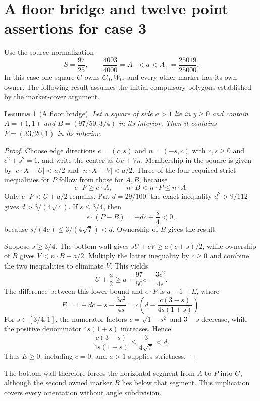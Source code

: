 \documentclass[11pt]{article}
\newtheorem{lemma}[theorem]{Lemma}
\begin{document}
\section{A floor bridge and twelve point assertions for case 3}
\label{sec:short-case-three}

Use the source normalization
\[
 S=\frac{97}{25},\qquad
 \frac{4003}{4000}=A_-<a<A_+=\frac{25019}{25000}.
\]
In this case one square $G$ owns $C_0,W_0$, and every other marker has its own
owner.  The following result assumes the initial compulsory polygons
established by the marker-cover argument.

\begin{lemma}[A floor bridge]\label{lem:case-three-floor-bridge}
Let a square of side $a>1$ lie in $y\ge0$ and contain
$A=(1,1)$ and $B=(97/50,3/4)$ in its interior. Then it contains
$P=(33/20,1)$ in its interior.
\end{lemma}
\begin{proof}
Choose edge directions $e=(c,s)$ and $n=(-s,c)$ with $c,s\ge0$ and
$c^2+s^2=1$, and write the center as $Ue+Vn$. Membership in the square
is given by $|e\cdot X-U|<a/2$ and $|n\cdot X-V|<a/2$.
Three of the four required strict inequalities for $P$ follow from those
for $A,B$, because
\[
 e\cdot P\ge e\cdot A,\qquad
 n\cdot B<n\cdot P\le n\cdot A.
\]
Only $e\cdot P<U+a/2$ remains. Put $d=29/100$; the exact inequality
$d^2>9/112$ gives $d>3/(4\sqrt7)$.
If $s\le3/4$, then
\[
 e\cdot(P-B)=-dc+\frac{s}{4}<0,
\]
because $s/(4c)\le3/(4\sqrt7)<d$. Ownership of $B$ gives the result.

Suppose $s\ge3/4$. The bottom wall gives
$sU+cV\ge a(c+s)/2$, while ownership of $B$ gives
$V<n\cdot B+a/2$. Multiply the latter inequality by $c\ge0$ and
combine the two inequalities to eliminate $V$. This yields
\[
 U+\frac a2\ge a+\frac{97}{50}c-\frac{3c^2}{4s}.
\]
The difference between this lower bound and $e\cdot P$ is $a-1+E$, where
\[
 E=1+dc-s-\frac{3c^2}{4s}
  =c\left(d-\frac{c(3-s)}{4s(1+s)}\right).
\]
For $s\in[3/4,1]$, the numerator factors $c=\sqrt{1-s^2}$ and $3-s$
decrease, while the positive denominator $4s(1+s)$ increases. Hence
\[
 \frac{c(3-s)}{4s(1+s)}\le\frac{3}{4\sqrt7}<d.
\]
Thus $E\ge0$, including $c=0$, and $a>1$ supplies strictness.
\end{proof}
The bottom wall therefore forces the horizontal segment from $A$ to $P$
into $G$, although the second owned marker $B$ lies below that segment.
This implication covers every orientation without angle subdivision.
\end{document}
